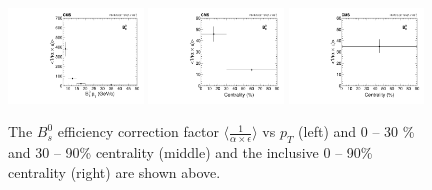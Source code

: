 \begin{figure}[h]
\begin{center}
\includegraphics[width= 0.32\textwidth]{Figures/Chapter5/EffPlotPt.pdf}
\includegraphics[width= 0.32\textwidth]{Figures/Chapter5/EffPlotCent.pdf}
\includegraphics[width= 0.32\textwidth]{Figures/Chapter5/EffPlotCentInc.pdf}
\caption{The $B^0_s$ efficiency correction factor $\langle\frac{1}{\alpha \times \epsilon} \rangle$ vs $p_T$ (left) and 0 -- 30 \% and 30 -- 90\% centrality (middle) and the inclusive 0 -- 90\% centrality (right) are shown above.}
\label{BsEffFig}
\end{center}
\end{figure}

